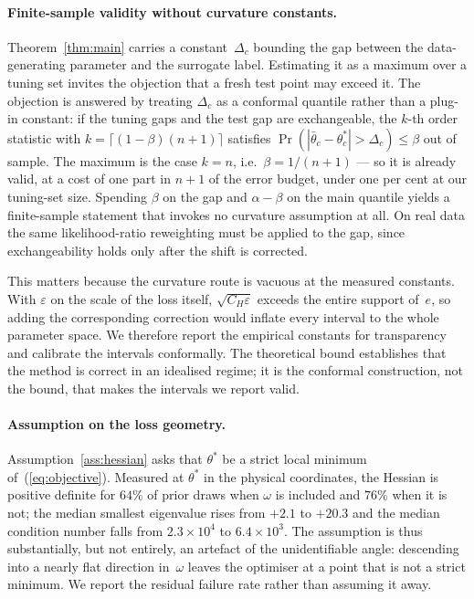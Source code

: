 \paragraph{Finite-sample validity without curvature constants.}
Theorem~\ref{thm:main} carries a constant~$\Delta_c$ bounding the gap between
the data-generating parameter and the surrogate label.  Estimating it as a
maximum over a tuning set invites the objection that a fresh test point may
exceed it.  The objection is answered by treating $\Delta_c$ as a conformal
quantile rather than a plug-in constant: if the tuning gaps and the test gap
are exchangeable, the $k$-th order statistic with
$k = \lceil (1-\beta)(n+1) \rceil$ satisfies
$\Pr(|\bar\theta_c - \theta^\ast_c| > \Delta_c) \le \beta$ out of sample.  The
maximum is the case $k = n$, i.e.\ $\beta = 1/(n+1)$ --- so it is already
valid, at a cost of one part in $n+1$ of the error budget, under one per cent
at our tuning-set size.  Spending $\beta$ on the gap and $\alpha - \beta$ on
the main quantile yields a finite-sample statement that invokes no curvature
assumption at all.  On real data the same likelihood-ratio reweighting must be
applied to the gap, since exchangeability holds only after the shift is
corrected.

This matters because the curvature route is vacuous at the measured constants.
With $\varepsilon$ on the scale of the loss itself, $\sqrt{C_H \varepsilon}$
exceeds the entire support of~$e$, so adding the corresponding correction would
inflate every interval to the whole parameter space.  We therefore report the
empirical constants for transparency and calibrate the intervals
conformally.  The theoretical bound establishes that the method is correct in
an idealised regime; it is the conformal construction, not the bound, that
makes the intervals we report valid.

\paragraph{Assumption on the loss geometry.}
Assumption~\ref{ass:hessian} asks that $\theta^\ast$ be a strict local minimum
of~(\ref{eq:objective}).  Measured at $\theta^\ast$ in the physical
coordinates, the Hessian is positive definite for $64\%$ of prior draws when
$\omega$ is included and $76\%$ when it is not; the median smallest eigenvalue
rises from $+2.1$ to $+20.3$ and the median condition number falls from
$2.3\times10^4$ to $6.4\times10^3$.  The assumption is thus substantially, but
not entirely, an artefact of the unidentifiable angle: descending into a nearly
flat direction in~$\omega$ leaves the optimiser at a point that is not a strict
minimum.  We report the residual failure rate rather than assuming it away.

